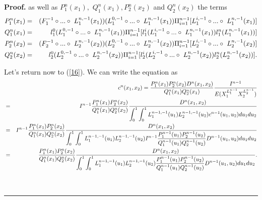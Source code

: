\documentclass[onecolumn]{article}
\providecommand{\dint}{\displaystyle\int}
\newenvironment{proof}[1][Proof]{\noindent\textbf{#1.} }{\ \rule{0.5em}{0.5em}}
\renewcommand{\dint}{\displaystyle\int}
\begin{document}
\begin{proof}
as well as $P_{1}^{n}(x_{1}),$ $Q_{1}^{n}(x_{1}),P_{2}^{n}(x_{2})$ and $%
Q_{2}^{n}(x_{2})$ the terms%
\begin{eqnarray}
P_{1}^{n}(x_{1}) &=&(F_{1}^{-1}\circ ...\circ \text{ }%
L_{1}^{n,-1}(x_{1}))(L_{1}^{0,-1}\circ ...\circ \text{ }L_{1}^{n,-1}(x_{1}))%
\Pi _{i=1}^{n-1}[L_{1}^{i,-1}\circ ...\circ \text{ }L_{1}^{n,-1}(x_{1})] 
\notag \\
Q_{1}^{n}(x_{1}) &=&l_{1}^{0}(L_{1}^{0,-1}\circ ...\circ \text{ }%
L_{1}^{n,-1}(x_{1}))\Pi _{i=1}^{n-1}[l_{1}^{i}(L_{1}^{i,-1}\circ ...\circ 
\text{ }L_{1}^{n,-1}(x_{1}))l_{1}^{n}(L_{1}^{n,-1}(x_{1}))]  \notag \\
P_{2}^{n}(x_{2}) &=&(F_{2}^{-1}\circ ...\circ \text{ }%
L_{2}^{n,-1}(x_{2}))(L_{2}^{0,-1}\circ ...\circ \text{ }L_{2}^{n,-1}(x_{2}))%
\Pi _{i=1}^{n-1}[L_{2}^{i,-1}\circ ...\circ \text{ }L_{2}^{n,-1}(x_{2})] 
\notag \\
Q_{2}^{n}(x_{2}) &=&l_{2}^{0}(L_{2}^{0,-1}\circ ...\circ \text{ }%
L_{2}^{n,-1}(x_{2}))\Pi _{i=1}^{n-1}[l_{2}^{i}(L_{2}^{i,-1}\circ ...\circ 
\text{ }L_{2}^{n,-1}(x_{2}))l_{2}^{n}(L_{2}^{n,-1}(x_{2}))].  \label{16.2}
\end{eqnarray}

Let's return now to (\ref{16}). We can write the equation as 
\begin{eqnarray}
&&c^{n}(x_{1},x_{2})=\frac{P_{1}^{n}(x_{1})P_{2}^{n}(x_{2})D^{n}(x_{1},x_{2})%
}{Q_{1}^{n}(x_{1})Q_{2}^{n}(x_{1})}\frac{I^{n-1}}{%
E(X_{1}^{L_{1}^{n-1}}X_{2}^{L_{2}^{n-1}})}  \notag \\
&=&I^{n-1}\frac{P_{1}^{n}(x_{1})P_{2}^{n}(x_{2})}{%
Q_{1}^{n}(x_{1})Q_{2}^{n}(x_{2})}\frac{D^{n}(x_{1},x_{2})}{%
\dint\nolimits_{0}^{1}\dint%
\nolimits_{0}^{1}L_{1}^{n-1,-1}(u_{1})L_{2}^{n-1,-1}(u_{2})c^{n-1}(u_{1},u_{2})du_{1}du_{2}%
}  \notag \\
&=&I^{n-1}\frac{P_{1}^{n}(x_{1})P_{2}^{n}(x_{2})}{%
Q_{1}^{n}(x_{1})Q_{2}^{n}(x_{2})}\frac{D^{n}(x_{1},x_{2})}{%
\dint\nolimits_{0}^{1}\dint%
\nolimits_{0}^{1}L_{1}^{n-1,-1}(u_{1})L_{2}^{n-1,-1}(u_{2})I^{n-1}\frac{%
P_{1}^{n-1}(u_{1})P_{2}^{n-1}(u_{2})}{Q_{1}^{n-1}(u_{1})Q_{2}^{n-1}(u_{2})}%
D^{n-1}(u_{1},u_{2})du_{1}du_{2}}  \notag \\
&=&\frac{P_{1}^{n}(x_{1})P_{2}^{n}(x_{2})}{Q_{1}^{n}(x_{1})Q_{2}^{n}(x_{2})}%
\frac{D^{n}(x_{1},x_{2})}{\dint\nolimits_{0}^{1}\dint%
\nolimits_{0}^{1}L_{1}^{n-1,-1}(u_{1})L_{2}^{n-1,-1}(u_{2})\frac{%
P_{1}^{n-1}(u_{1})P_{2}^{n-1}(u_{2})}{Q_{1}^{n-1}(u_{1})Q_{2}^{n-1}(u_{2})}%
D^{n-1}(u_{1},u_{2})du_{1}du_{2}}.  \label{69}
\end{eqnarray}


\end{proof}
\end{document}
